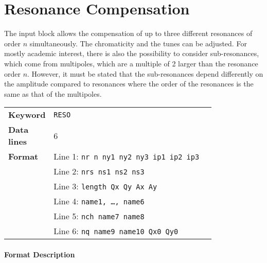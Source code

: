 \section{Resonance Compensation} \label{ResCom}

The input block allows the compensation of up to three different resonances of order $n$ simultaneously.
The chromaticity and the tunes can be adjusted.
For mostly academic interest, there is also the possibility to consider sub-resonances, which come from multipoles, which are a multiple of 2 larger than the resonance order $n$.
However, it must be stated that the sub-resonances depend differently on the amplitude compared to resonances where the order of the resonances is the same as that of the multipoles.

\bigskip
\begin{tabular}{@{}lp{0.8\linewidth}}
    \textbf{Keyword}    & \texttt{RESO}\index{RESO} \\
    \textbf{Data lines} & 6 \\
    \textbf{Format}     & Line 1: \texttt{nr n ny1 ny2 ny3 ip1 ip2 ip3} \\
                        & Line 2: \texttt{nrs ns1 ns2 ns3} \\
                        & Line 3: \texttt{length Qx Qy Ax Ay} \\
                        & Line 4: \texttt{name1, \dots, name6} \\
                        & Line 5: \texttt{nch name7 name8} \\
                        & Line 6: \texttt{nq name9 name10 Qx0 Qy0}
\end{tabular}

\paragraph{Format Description}~

